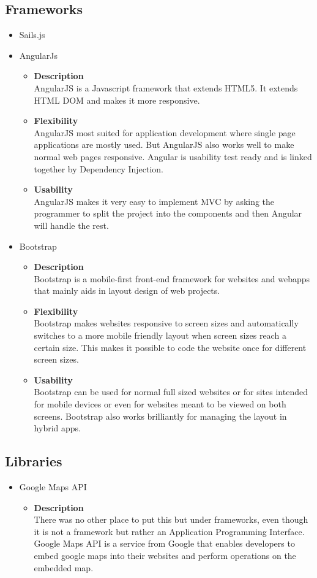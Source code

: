 \documentclass[11pt,fleqn]{book} %
\begin{document}
	\subsection{Frameworks}
	\begin{itemize}
		\item Sails.js
		\item AngularJs
		\begin{itemize}
			\item \textbf{Description}\\
			AngularJS is a Javascript framework that extends HTML5. It extends HTML DOM and makes it more responsive.
			\item \textbf{Flexibility}\\
			AngularJS most suited for application development where single page applications are mostly used. But AngularJS also works well to make normal web pages responsive. Angular is usability test ready and is linked together by Dependency Injection.
			\item \textbf{Usability}\\
			AngularJS makes it very easy to implement MVC by asking the programmer to split the project into the components and then Angular will handle the rest.
		\end{itemize}
		\item Bootstrap
		\begin{itemize}
			\item \textbf{Description}\\
			Bootstrap is a mobile-first front-end framework for websites and webapps that mainly aids in layout design of web projects.
			\item \textbf{Flexibility}\\
			Bootstrap makes websites responsive to screen sizes and automatically switches to a more mobile friendly layout when screen sizes reach a certain size. This makes it possible to code the website once for different screen sizes.
			\item \textbf{Usability}\\
			Bootstrap can be used for normal full sized websites or for sites intended for mobile devices or even for websites meant to be viewed on both screens. Bootstrap also works brilliantly for managing the layout in hybrid apps.
		\end{itemize}
	\end{itemize}
	\subsection{Libraries}
	\begin{itemize}
		\item Google Maps API
		\begin{itemize}
			\item \textbf{Description}\\
			There was no other place to put this but under frameworks, even though it is not a framework but rather an Application Programming Interface. Google Maps API is a service from Google that enables developers to embed google maps into their websites and perform operations on the embedded map.
		\end{itemize}
	\end{itemize}
\end{document}
